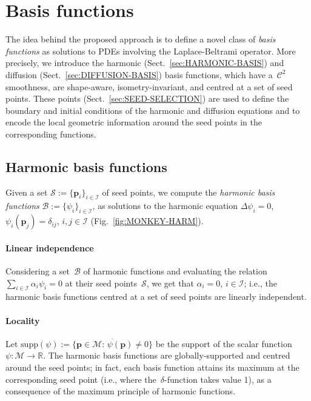 \documentclass[acmtog,authorversion]{acmart}
\begin{document}
\section{Basis functions\label{sec:SPECTRAL-BASIS}}
The idea behind the proposed approach is to define a novel class of \emph{basis functions} as solutions to PDEs involving the Laplace-Beltrami operator. More precisely, we introduce the harmonic (Sect.~\ref{sec:HARMONIC-BASIS}) and diffusion (Sect.~\ref{sec:DIFFUSION-BASIS}) basis functions, which have a~$\mathcal{C}^{2}$ smoothness, are shape-aware, isometry-invariant, and centred at a set of seed points. These points (Sect.~\ref{sec:SEED-SELECTION}) are used to define the boundary and initial conditions of the harmonic and diffusion equations and to encode the local geometric information around the seed points in the corresponding functions.

\subsection{Harmonic basis functions\label{sec:HARMONIC-BASIS}}
Given a set \mbox{$\mathcal{S}:=\{\mathbf{p}_{i}\}_{i\in\mathcal{I}}$} of seed points, we compute the \emph{harmonic basis functions} \mbox{$\mathcal{B}:=\{\psi_{i}\}_{i\in\mathcal{I}}$}, as solutions to the harmonic equation \mbox{$\Delta\psi_{i}=0$}, \mbox{$\psi_{i}(\mathbf{p}_{j})=\delta_{ij}$}, \mbox{$i,j\in\mathcal{I}$} (Fig.~\ref{fig:MONKEY-HARM}). 

\paragraph{Linear independence} 
Considering a set~$\mathcal{B}$ of harmonic functions and evaluating the relation \mbox{$\sum_{i\in\mathcal{I}}\alpha_{i}\psi_{i}=0$} at their seed points~$\mathcal{S}$, we get that \mbox{$\alpha_{i}=0$}, \mbox{$i\in\mathcal{I}$}; i.e., the harmonic basis functions centred at a set of seed points are linearly independent. 

\paragraph*{Locality}
Let \mbox{$\textrm{supp}(\psi):=\overline{\{\mathbf{p}\in\mathcal{M}:\,\psi(\mathbf{p})\neq 0\}}$} be the support of the scalar function \mbox{$\psi:\mathcal{M}\rightarrow\mathbb{R}$}. The harmonic basis functions are globally-supported and centred around the seed points; in fact, each basis function attains its maximum at the corresponding seed point (i.e., where the~$\delta$-function takes value 1), as a consequence of the maximum principle of harmonic functions.
\end{document}
